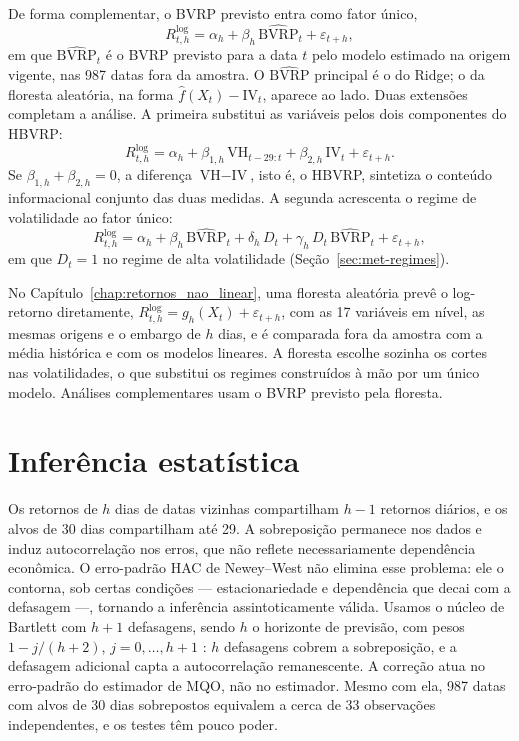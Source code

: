 De forma complementar, o BVRP previsto entra como fator único,
\begin{equation}
R^{\log}_{t,h} = \alpha_h + \beta_h \, \widehat{\text{BVRP}}_t + \varepsilon_{t+h},
\label{eq:met-retorno-linear}
\end{equation}
em que $\widehat{\text{BVRP}}_t$ é o BVRP previsto para a data $t$ pelo modelo
estimado na origem vigente, nas 987 datas fora da amostra. O
$\widehat{\text{BVRP}}$ principal é o do Ridge; o da floresta aleatória, na
forma $\hat f(X_t) - \text{IV}_t$, aparece ao lado. Duas extensões completam a
análise. A primeira substitui as variáveis pelos dois componentes do HBVRP:
\begin{equation}
R^{\log}_{t,h} = \alpha_h + \beta_{1,h} \, \text{VH}_{t-29:t} + \beta_{2,h} \,
\text{IV}_t + \varepsilon_{t+h}.
\label{eq:met-retorno-componentes}
\end{equation}
Se $\beta_{1,h} + \beta_{2,h} = 0$, a diferença $\text{VH} - \text{IV}$, isto
é, o HBVRP, sintetiza o conteúdo informacional conjunto das duas medidas. A
segunda acrescenta o regime de volatilidade ao fator único:
\begin{equation}
R^{\log}_{t,h} = \alpha_h + \beta_h \, \widehat{\text{BVRP}}_t + \delta_h \, D_t
+ \gamma_h \, D_t \, \widehat{\text{BVRP}}_t + \varepsilon_{t+h},
\label{eq:met-retorno-regime}
\end{equation}
em que $D_t = 1$ no regime de alta volatilidade (Seção~\ref{sec:met-regimes}).

No Capítulo~\ref{chap:retornos_nao_linear}, uma floresta aleatória prevê o
log-retorno diretamente, $R^{\log}_{t,h} = g_h(X_t) + \varepsilon_{t+h}$, com
as 17 variáveis em nível, as mesmas origens e o embargo de $h$ dias, e é
comparada fora da amostra com a média histórica e com os modelos lineares. A
floresta escolhe sozinha os cortes nas volatilidades, o que substitui os
regimes construídos à mão por um único modelo. Análises complementares usam o
BVRP previsto pela floresta.

\section{Inferência estatística}
\label{sec:met-inferencia}

Os retornos de $h$ dias de datas vizinhas compartilham $h-1$ retornos diários,
e os alvos de 30 dias compartilham até 29. A sobreposição permanece nos dados e
induz autocorrelação nos erros, que não reflete necessariamente dependência
econômica. O erro-padrão HAC de Newey--West não elimina esse problema: ele o
contorna, sob certas condições --- estacionariedade e dependência que decai com
a defasagem ---, tornando a inferência assintoticamente válida. Usamos
o núcleo de Bartlett com $h+1$ defasagens, sendo $h$ o horizonte de
previsão, com pesos $1 - j/(h+2)$, $j = 0, \ldots, h+1$
\citep{newey1987simple}: $h$ defasagens cobrem a sobreposição, e a defasagem
adicional capta a autocorrelação remanescente. A correção atua no
erro-padrão do estimador de MQO, não no estimador. Mesmo com ela, 987 datas com
alvos de 30 dias sobrepostos equivalem a cerca de 33 observações
independentes, e os testes têm pouco poder.


